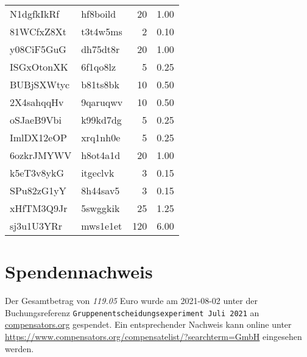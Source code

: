 \documentclass[]{elsarticle} %
\begin{document}
\begin{longtable}{llrr}
N1dgfkIkRf & hf8boild & 20 & 1.00\\
81WCfxZ8Xt & t3t4w5ms & 2 & 0.10\\
y08CiF5GuG & dh75dt8r & 20 & 1.00\\
\addlinespace
ISGxOtonXK & 6f1qo8lz & 5 & 0.25\\
BUBjSXWtyc & b81ts8bk & 10 & 0.50\\
2X4sahqqHv & 9qaruqwv & 10 & 0.50\\
oSJaeB9Vbi & k99kd7dg & 5 & 0.25\\
ImlDX12eOP & xrq1nh0e & 5 & 0.25\\
\addlinespace
6ozkrJMYWV & h8ot4a1d & 20 & 1.00\\
k5eT3v8ykG & itgeclvk & 3 & 0.15\\
SPu82zG1yY & 8h44sav5 & 3 & 0.15\\
xHfTM3Q9Jr & 5swggkik & 25 & 1.25\\
sj3u1U3YRr & mws1e1et & 120 & 6.00\\*
\end{longtable}
\endgroup{}

\hypertarget{spendennachweis}{%
\section{Spendennachweis}\label{spendennachweis}}

Der Gesamtbetrag von \emph{119.05} Euro wurde am 2021-08-02 unter der
Buchungsreferenz \texttt{Gruppenentscheidungsexperiment\ Juli\ 2021} an
\url{compensators.org} gespendet. Ein entsprechender Nachweis kann
online unter
\url{https://www.compensators.org/compensatelist/?searchterm=GmbH}
eingesehen werden.
\end{document}
